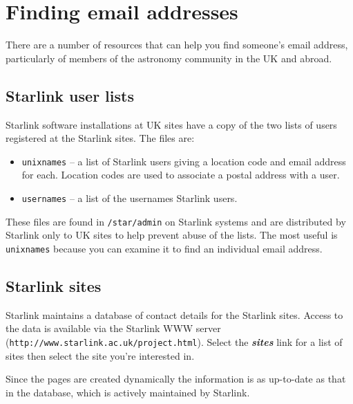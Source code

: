 \documentclass[twoside,11pt]{article}
\newcommand{\htmladdnormallink}[2]{#1}
\newcommand{\latex}[1]{#1}
\newcommand{\xlabel}[1]{}
\renewcommand{\_}{\texttt{\symbol{95}}}
\begin{document}
\section{\xlabel{finding_email_addresses}Finding email addresses}
\label{finding_email_addresses}

There are a number of resources that can help you find someone's email 
address, particularly of members of the astronomy community in the UK and 
abroad.  

\subsection{\xlabel{starlink_user_lists}Starlink user lists}
Starlink software installations at UK sites have a copy of the two lists
of users registered at the Starlink sites.  The files are:

\begin{itemize}

\item \texttt{unixnames} -- a list of Starlink users giving a location
code and email address for each.  Location codes are used to associate
a postal address with a user.

\item \texttt{usernames} -- a list of the usernames Starlink users.

\end{itemize}

These files are found in \texttt{/star/admin} on Starlink systems and
are distributed by Starlink only to UK sites to help prevent abuse of
the lists.  The most useful is \texttt{unixnames} because you can
examine it to find an individual email address.

\subsection{\xlabel{starlink_sites}Starlink sites}
\label{starlink_sites}

Starlink maintains a database of contact details for the Starlink
sites.  Access to the data is available via the
\htmladdnormallink{Starlink WWW
server}{http://www.starlink.ac.uk/project.html}
\latex{(\texttt{http://www.starlink.ac.uk/project.html})}.
Select the \textbf{\textit{sites}} link for a list of sites then select
the site you're interested in.

Since the pages are created dynamically the information is as
up-to-date as that in the database, which is actively maintained by
Starlink.
\end{document}
